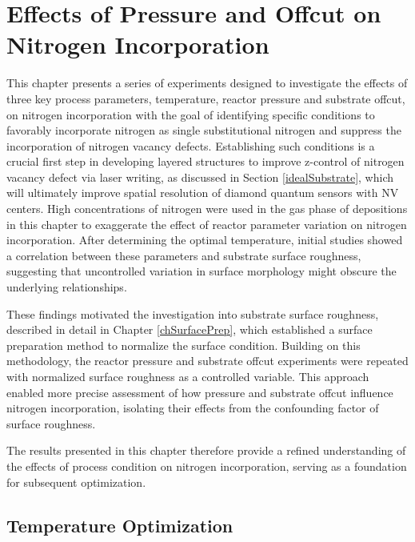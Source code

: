 \chapter{Effects of Pressure and Offcut on Nitrogen Incorporation}
\label{chPressureOffcut}
\indent

This chapter presents a series of experiments designed to investigate the effects of three key process parameters, temperature, reactor pressure and substrate offcut, on nitrogen incorporation with the goal of identifying specific conditions to favorably incorporate nitrogen as single substitutional nitrogen and suppress the incorporation of nitrogen vacancy defects. Establishing such conditions is a crucial first step in developing layered structures to improve z-control of nitrogen vacancy defect via laser writing, as discussed in Section \ref{idealSubstrate}, which will ultimately improve spatial resolution of diamond quantum sensors with NV centers. High concentrations of nitrogen were used in the gas phase of depositions in this chapter to exaggerate the effect of reactor parameter variation on nitrogen incorporation. After determining the optimal temperature, initial studies showed a correlation between these parameters and substrate surface roughness, suggesting that uncontrolled variation in surface morphology might obscure the underlying relationships.

These findings motivated the investigation into substrate surface roughness, described in detail in Chapter \ref{chSurfacePrep}, which established a surface preparation method to normalize the surface condition. Building on this methodology, the reactor pressure and substrate offcut experiments were repeated with normalized surface roughness as a controlled variable. This approach enabled more precise assessment of how pressure and substrate offcut influence nitrogen incorporation, isolating their effects from the confounding factor of surface roughness.

The results presented in this chapter therefore provide a refined understanding of the effects of process condition on nitrogen incorporation, serving as a foundation for subsequent optimization.

\section{Temperature Optimization}
\indent

